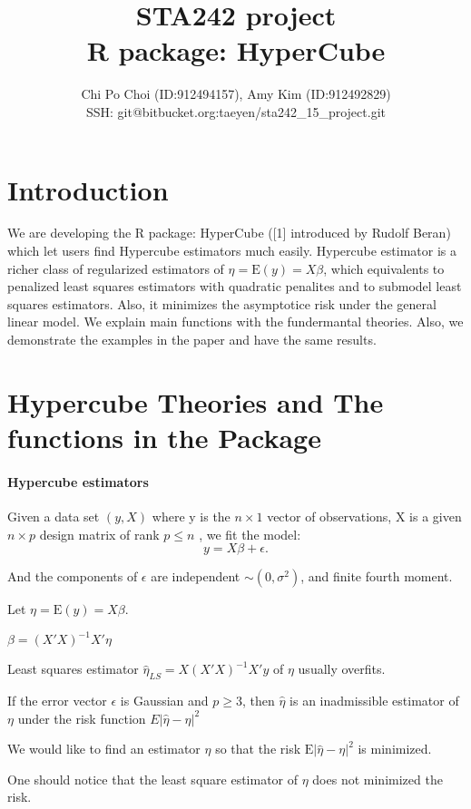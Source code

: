 \documentclass[draft]{article}
\title{STA242 project\\
	    R package: HyperCube}
\author{Chi Po Choi (ID:912494157), Amy Kim (ID:912492829)\\
		SSH: git@bitbucket.org:taeyen/sta242\_15\_project.git}
\begin{document}
\maketitle

\section{Introduction}
We are developing the R package: HyperCube ([1] introduced by Rudolf Beran) which let users find Hypercube estimators much easily. Hypercube estimator is a richer class of regularized estimators of $\eta = \text{E}(y) = X\beta$, which equivalents to penalized least squares estimators with quadratic penalites and to submodel least squares estimators. Also, it minimizes the asymptotice risk under the general linear model. We explain main functions with the fundermantal theories.\cite{beran2014hypercube} Also, we demonstrate the examples in the paper and have the same results.

\section{Hypercube Theories and The functions in the Package}


\paragraph{Hypercube estimators}
Given a data set $(y, X)$ where y is the $n \times 1$ vector of observations, X is a given $n \times p$ design matrix of rank $ p \leq n$ , we fit the model:
$$
y = X\beta + \epsilon.
$$

And the components of $\epsilon$ are independent $\sim (0, \sigma^2)$, and finite fourth moment.

Let $\eta = \text{E}(y) = X\beta$.

$\beta = (X'X)^{-1}X'\eta$



Least squares estimator $\hat{\eta}_{LS} = X(X'X)^{-1}X'y$ of $\eta$ usually overfits.

If the error vector $\epsilon$ is Gaussian and $p \geq 3$, then $\hat{\eta}$ is an inadmissible estimator of $\eta$ under the risk function $E|\hat{\eta} - \eta|^2$


 We would like to find an estimator $\hat{\eta}$ so that the risk $\text{E} | \hat{\eta} - \eta|^2$ is minimized. 
 
 One should notice that the least square estimator of $\eta$ does not minimized the risk. 
\end{document}
